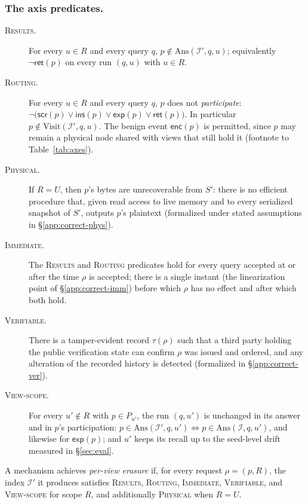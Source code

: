 \documentclass[sigconf, nonacm, review]{acmart}
\begin{document}
\subsubsection{The axis predicates.}
\label{app:axis-preds}
\begin{description}
\item[\textsc{Results}.] For every $u\in R$ and every query $q$,
  $p\notin\mathrm{Ans}(\mathcal{I}',q,u)$; equivalently $\lnot\mathsf{ret}(p)$
  on every run $(q,u)$ with $u\in R$.
\item[\textsc{Routing}.] For every $u\in R$ and every query $q$, $p$ does not
  \emph{participate}: $\lnot\big(\mathsf{scr}(p)\lor\mathsf{ins}(p)\lor
  \mathsf{exp}(p)\lor\mathsf{ret}(p)\big)$. In particular
  $p\notin\mathrm{Visit}(\mathcal{I}',q,u)$. The benign event $\mathsf{enc}(p)$
  is permitted, since $p$ may remain a physical node shared with views that
  still hold it (footnote to Table~\ref{tab:axes}).
\item[\textsc{Physical}.] If $R=U$, then $p$'s bytes are unrecoverable from
  $S'$: there is no efficient procedure that, given read access to live memory
  and to every serialized snapshot of $S'$, outputs $p$'s plaintext (formalized
  under stated assumptions in \S\ref{app:correct-phys}).
\item[\textsc{Immediate}.] The \textsc{Results} and \textsc{Routing}
  predicates hold for every query accepted at or after the time $\rho$ is
  accepted; there is a single instant (the linearization point of
  \S\ref{app:correct-imm}) before which $\rho$ has no effect and after which
  both hold.
\item[\textsc{Verifiable}.] There is a tamper-evident record $\tau(\rho)$ such
  that a third party holding the public verification state can confirm $\rho$
  was issued and ordered, and any alteration of the recorded history is
  detected (formalized in \S\ref{app:correct-ver}).
\item[\textsc{View-scope}.] For every $u'\notin R$ with $p\in P_{u'}$, the run
  $(q,u')$ is unchanged in its answer and in $p$'s participation: $p\in
  \mathrm{Ans}(\mathcal{I}',q,u')\iff p\in\mathrm{Ans}(\mathcal{I},q,u')$, and
  likewise for $\mathsf{exp}(p)$; and $u'$ keeps its recall up to the
  seed-level drift measured in \S\ref{sec:eval}.
\end{description}

\begin{definition}
\label{def:pve-app}
A mechanism achieves \emph{per-view erasure} if, for every request
$\rho=(p,R)$, the index $\mathcal{I}'$ it produces satisfies
\textsc{Results}, \textsc{Routing}, \textsc{Immediate}, \textsc{Verifiable},
and \textsc{View-scope} for scope $R$, and additionally \textsc{Physical} when
$R=U$.
\end{definition}
\end{document}
